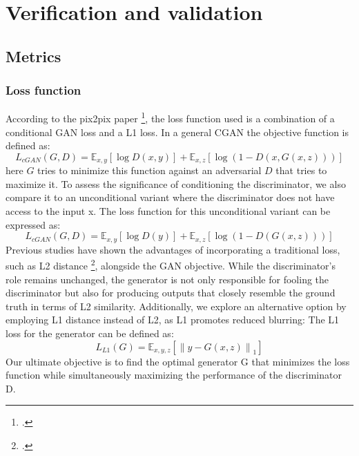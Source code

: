 \chapter{Verification and validation}\label{cap:verification-validation}
\section{Metrics}\label{sec:metrics}
\subsection{Loss function}
According to the pix2pix paper \footcite{paper:pix2pix}, the loss function used is a combination of a conditional GAN loss and a L1 loss.
In a general CGAN the objective function is defined as:
\begin{equation}
    \label{eq:cgan-loss}
    L_{cGAN}(G, D) = \mathbb{E}_{x,y}[\log D(x, y)] + \mathbb{E}_{x,z}[\log(1 - D(x, G(x, z)))]
\end{equation}
here $G$ tries to minimize this function against an adversarial $D$ that tries to maximize it.
To assess the significance of conditioning the discriminator, we also compare it to an unconditional variant where the discriminator does not have access to the input x. 
The loss function for this unconditional variant can be expressed as:
\begin{equation}
    \label{eq:cgan-loss-uncond}
    L_{cGAN}(G, D) = \mathbb{E}_{x,y}[\log D(y)] + \mathbb{E}_{x,z}[\log(1 - D(G(x, z)))]
\end{equation}
Previous studies have shown the advantages of incorporating a traditional loss, such as L2 distance \footcite{paper:DPathakCVPR16}, alongside the GAN objective. 
While the discriminator's role remains unchanged, the generator is not only responsible for fooling the discriminator but also for producing outputs that closely resemble the ground truth in terms of L2 similarity. 
Additionally, we explore an alternative option by employing L1 distance instead of L2, as L1 promotes reduced blurring:
The L1 loss for the generator can be defined as:
\begin{equation}
    \label{eq:l1-loss}
    L_{L1}(G) = \mathbb{E}_{x,y,z}\left[\left\|y - G(x, z)\right\|_1\right]
\end{equation}
Our ultimate objective is to find the optimal generator G that minimizes the loss function while simultaneously maximizing the performance of the discriminator D. 
